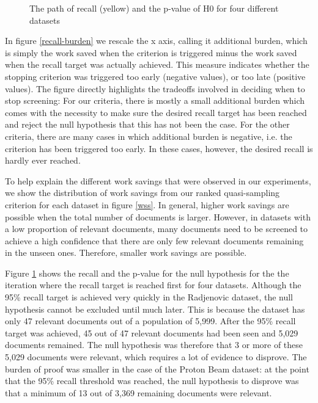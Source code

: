 \documentclass{bmcart}
\begin{document}
\begin{figure}
		\caption{\small The path of recall (yellow) and the p-value of H0 for four different datasets} 
		\label{H0paths}
	\end{figure}
	
	In figure \ref{recall-burden} we rescale the x axis, calling it additional burden, which is simply the work saved when the criterion is triggered minus the work saved when the recall target was actually achieved. This measure indicates whether the stopping criterion was triggered too early (negative values), or too late (positive values). The figure directly highlights the tradeoffs involved in deciding when to stop screening: For our criteria, there is mostly a small additional burden which comes with the necessity to make sure the desired recall target has been reached and reject the null hypothesis that this has not been the case. For the other criteria, there are many cases in which additional burden is negative, i.e. the criterion has been triggered too early. In these cases, however, the desired recall is hardly ever reached.
	
	To help explain the different work savings that were observed in our experiments, we show the distribution of work savings from our ranked quasi-sampling criterion for each dataset in figure \ref{wss}. In general, higher work savings are possible when the total number of documents is larger. However, in datasets with a low proportion of relevant documents, many documents need to be screened to achieve a high confidence that there are only few relevant documents remaining in the unseen ones. Therefore, smaller work savings are possible. 
	
	Figure \ref{H0paths} shows the recall and the p-value for the null hypothesis for the the iteration where the recall target is reached first for four datasets. Although the 95\% recall target is achieved very quickly in the Radjenovic dataset, the null hypothesis cannot be excluded until much later. This is because the dataset has only 47 relevant documents out of a population of 5,999. After the 95\% recall target was achieved, 45 out of 47 relevant documents had been seen and 5,029 documents remained. The null hypothesis was therefore that 3 or more of these 5,029 documents were relevant, which requires a lot of evidence to disprove. The burden of proof was smaller in the case of the Proton Beam dataset: at the point that the 95\% recall threshold was reached, the null hypothesis to disprove was that a minimum of 13 out of 3,369 remaining documents were relevant. 
	
\end{document}

